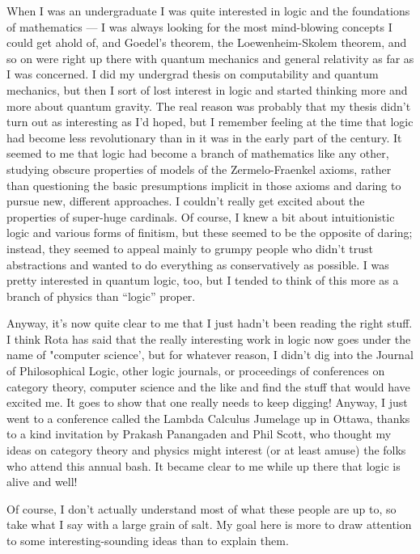 \documentclass{article}
\begin{document}
When I was an undergraduate I was quite interested in logic and the
foundations of mathematics --- I was always looking for the most
mind-blowing concepts I could get ahold of, and Goedel's theorem, the
Loewenheim-Skolem theorem, and so on were right up there with quantum
mechanics and general relativity as far as I was concerned. I did my
undergrad thesis on computability and quantum mechanics, but then I sort
of lost interest in logic and started thinking more and more about
quantum gravity. The real reason was probably that my thesis didn't turn
out as interesting as I'd hoped, but I remember feeling at the time that
logic had become less revolutionary than in it was in the early part of
the century. It seemed to me that logic had become a branch of
mathematics like any other, studying obscure properties of models of the
Zermelo-Fraenkel axioms, rather than questioning the basic presumptions
implicit in those axioms and daring to pursue new, different approaches.
I couldn't really get excited about the properties of super-huge
cardinals. Of course, I knew a bit about intuitionistic logic and
various forms of finitism, but these seemed to be the opposite of
daring; instead, they seemed to appeal mainly to grumpy people who
didn't trust abstractions and wanted to do everything as conservatively
as possible. I was pretty interested in quantum logic, too, but I tended
to think of this more as a branch of physics than ``logic'' proper.

Anyway, it's now quite clear to me that I just hadn't been reading the
right stuff. I think Rota has said that the really interesting work in
logic now goes under the name of "computer science', but for whatever
reason, I didn't dig into the Journal of Philosophical Logic, other
logic journals, or proceedings of conferences on category theory,
computer science and the like and find the stuff that would have excited
me. It goes to show that one really needs to keep digging! Anyway, I
just went to a conference called the Lambda Calculus Jumelage up in
Ottawa, thanks to a kind invitation by Prakash Panangaden and Phil
Scott, who thought my ideas on category theory and physics might
interest (or at least amuse) the folks who attend this annual bash. It
became clear to me while up there that logic is alive and well!

Of course, I don't actually understand most of what these people are up
to, so take what I say with a large grain of salt. My goal here is more
to draw attention to some interesting-sounding ideas than to explain
them.
\end{document}

